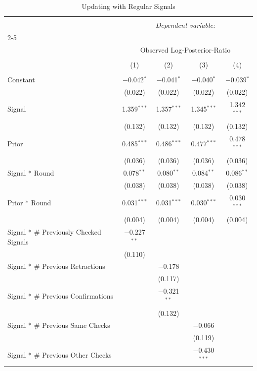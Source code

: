 
\begin{table}[!htbp] \centering 
  \caption{Updating with Regular Signals} 
  \label{} 
\begin{tabular}{@{\extracolsep{5pt}}lcccc} 
\\[-1.8ex]\hline 
\hline \\[-1.8ex] 
 & \multicolumn{4}{c}{\textit{Dependent variable:}} \\ 
\cline{2-5} 
\\[-1.8ex] & \multicolumn{4}{c}{Observed Log-Posterior-Ratio} \\ 
\\[-1.8ex] & (1) & (2) & (3) & (4)\\ 
\hline \\[-1.8ex] 
 Constant & $-$0.042$^{*}$ & $-$0.041$^{*}$ & $-$0.040$^{*}$ & $-$0.039$^{*}$ \\ 
  & (0.022) & (0.022) & (0.022) & (0.022) \\ 
  Signal & 1.359$^{***}$ & 1.357$^{***}$ & 1.345$^{***}$ & 1.342$^{***}$ \\ 
  & (0.132) & (0.132) & (0.132) & (0.132) \\ 
  Prior & 0.485$^{***}$ & 0.486$^{***}$ & 0.477$^{***}$ & 0.478$^{***}$ \\ 
  & (0.036) & (0.036) & (0.036) & (0.036) \\ 
  Signal * Round & 0.078$^{**}$ & 0.080$^{**}$ & 0.084$^{**}$ & 0.086$^{**}$ \\ 
  & (0.038) & (0.038) & (0.038) & (0.038) \\ 
  Prior * Round & 0.031$^{***}$ & 0.031$^{***}$ & 0.030$^{***}$ & 0.030$^{***}$ \\ 
  & (0.004) & (0.004) & (0.004) & (0.004) \\ 
  Signal * # Previously Checked Signals & $-$0.227$^{**}$ &  &  &  \\ 
  & (0.110) &  &  &  \\ 
  Signal * # Previous Retractions &  & $-$0.178 &  &  \\ 
  &  & (0.117) &  &  \\ 
  Signal * # Previous Confirmations &  & $-$0.321$^{**}$ &  &  \\ 
  &  & (0.132) &  &  \\ 
  Signal * # Previous Same Checks &  &  & $-$0.066 &  \\ 
  &  &  & (0.119) &  \\ 
  Signal * # Previous Other Checks &  &  & $-$0.430$^{***}$ &  \\ 

\end{tabular}
\end{table}
